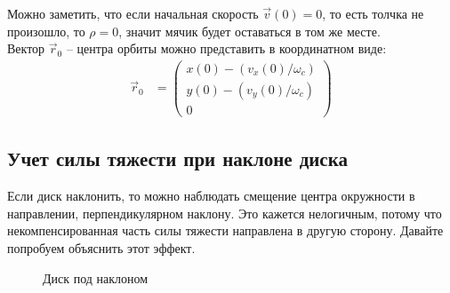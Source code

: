 \documentclass[a4paper,12pt]{article}
\begin{document}
	Можно заметить, что если начальная скорость $\vec{v}(0) = 0$, то есть толчка не произошло, то $\rho=0$, значит мячик будет оставаться в том же месте.\\
	
	Вектор $\vec{r}_0$ -- центра орбиты можно представить в координатном виде:
	\begin{align}
		\vec{r}_0 & = \begin{pmatrix}
			x(0)-(v_x(0)/\omega_c)\\
			y(0)-(v_y(0)/\omega_c)\\
			0
		\end{pmatrix}
	\end{align}
	
	\subsection{Учет силы тяжести при наклоне диска}
	Если диск наклонить, то можно наблюдать смещение центра окружности в направлении, перпендикулярном наклону. Это кажется нелогичным, потому что некомпенсированная часть силы тяжести направлена в другую сторону. Давайте попробуем объяснить этот эффект.
	\begin{figure}[H]
	\centering
	\caption{Диск под наклоном}
	\end{figure}
	
\end{document}
